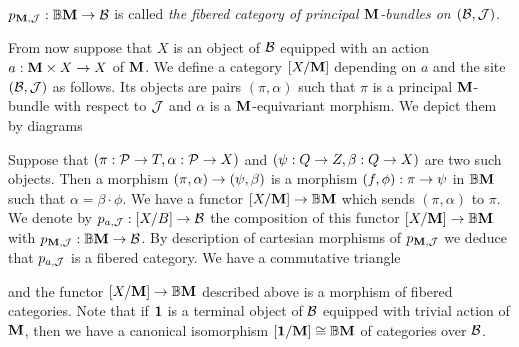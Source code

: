 \begin{definition}
$p_{\mathbf{M},{\mathcal J}}:\mathbb{B}\mathbf{M}\rightarrow {\mathcal B}$ is called \textit{the fibered category of principal $\mathbf{M}$-bundles on $({\mathcal B},{\mathcal J})$}.
\end{definition}
\noindent
From now suppose that $X$ is an object of ${\mathcal B}$ equipped with an action $a:\mathbf{M}\times X\rightarrow X$ of $\mathbf{M}$. We define a category $[X/\mathbf{M}]$ depending on $a$ and the site $({\mathcal B},{\mathcal J})$ as follows. Its objects are pairs $(\pi,\alpha)$ such that $\pi$ is a principal $\mathbf{M}$-bundle with respect to ${\mathcal J}$ and $\alpha$ is a $\mathbf{M}$-equivariant morphism. We depict them by diagrams
\begin{center}
\end{center}
Suppose that $(\pi:{\mathcal P}\rightarrow T,\alpha:{\mathcal P}\rightarrow X)$ and $(\psi:Q\rightarrow Z,\beta:Q\rightarrow X)$ are two such objects. Then a morphism $(\pi,\alpha)\rightarrow (\psi,\beta)$ is a morphism $(f,\phi):\pi\rightarrow \psi$ in $\mathbb{B}\mathbf{M}$ such that $\alpha = \beta \cdot \phi$. We have a functor $[X/\mathbf{M}] \rightarrow \mathbb{B}\mathbf{M}$ which sends $(\pi, \alpha)$ to $\pi$. We denote by $p_{a,{\mathcal J}}:[X/B]\rightarrow {\mathcal B}$ the composition of this functor $[X/\mathbf{M}] \rightarrow \mathbb{B}\mathbf{M}$ with $p_{\mathbf{M},{\mathcal J}}:\mathbb{B}\mathbf{M}\rightarrow {\mathcal B}$. By description of cartesian morphisms of $p_{\mathbf{M},{\mathcal J}}$ we deduce that $p_{a,{\mathcal J}}$ is a fibered category. We have a commutative triangle
\begin{center}
\end{center}
and the functor $[X/\mathbf{M}]\rightarrow \mathbb{B}\mathbf{M}$ described above is a morphism of fibered categories. Note that if $\mathbf{1}$ is a terminal object of ${\mathcal B}$ equipped with trivial action of $\mathbf{M}$, then we have a canonical isomorphism $[\mathbf{1}/\mathbf{M}] \cong \mathbb{B}\mathbf{M}$ of categories over ${\mathcal B}$.

